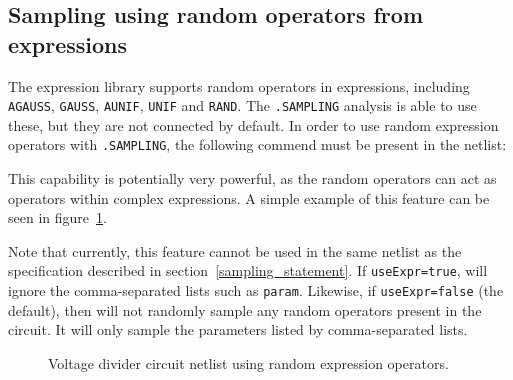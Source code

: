 \subsection{Sampling using random operators from expressions}

The \Xyce{} expression library supports random operators in expressions, 
including \texttt{AGAUSS}, \texttt{GAUSS}, \texttt{AUNIF}, \texttt{UNIF} and \texttt{RAND}.
The \Xyce{} \texttt{.SAMPLING} analysis is able to use these, but they are not
connected by default.  In order to use random expression operators with \texttt{.SAMPLING}, 
the following commend must be present in the netlist:


This capability is potentially very powerful, as the random operators can 
act as operators within complex expressions.  A simple example of this feature can be 
seen in figure~\ref{Sampling_Netlist_4}.

Note that currently, this feature cannot be used in the same netlist as the 
specification described in section~\ref{sampling_statement}.  If 
\texttt{useExpr=true}, \Xyce{} will ignore the comma-separated lists such as 
\texttt{param}.  Likewise, if \texttt{useExpr=false} (the default), then 
\Xyce{} will not randomly sample any random operators present in the circuit.  
It will only sample the parameters listed by comma-separated lists.

\begin{figure}[htbp]
\begin{centering}
\caption{Voltage divider circuit netlist using random expression operators.
\label{Sampling_Netlist_4}}
\end{centering}
\end{figure}



